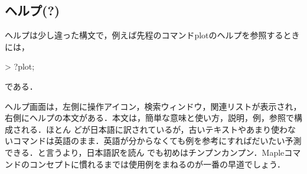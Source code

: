 \subsection{ヘルプ(?)}
ヘルプは少し違った構文で，例えば先程のコマンドplotのヘルプを参照するときには，
\begin{MapleInput}
> ?plot;
\end{MapleInput}
である．

ヘルプ画面は，左側に操作アイコン，検索ウィンドウ，関連リストが表示され，右側にヘルプの本文がある．本文は，簡単な意味と使い方，説明，例，参照で構成される．ほとん
どが日本語に訳されているが，古いテキストやあまり使わないコマンドは英語のまま．英語が分からなくても例を参考にすればだいたい予測できる．と言うより，日本語訳を読ん
でも初めはチンプンカンプン．Mapleコマンドのコンセプトに慣れるまでは使用例をまねるのが一番の早道でしょう．
